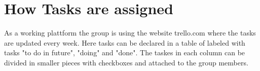 \section {How Tasks are assigned}
As a working plattform the group is using the website trello.com where the tasks are updated every week. Here tasks can be declared in a table of labeled with tasks "to do in future", "doing" and "done". The taskes in each column can be divided in smaller pieces with checkboxes and attached to the group members.
